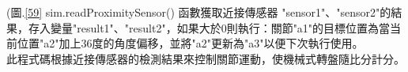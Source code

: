 (圖.\ref{59} sim.readProximitySensor() 函數獲取近接傳感器 "sensor1"、"sensor2"的結果，存入變量"result1"、"result2"，如果大於0則執行：關節"a1"的目標位置為當当前位置"a2"加上36度的角度偏移，並將"a2"更新為"a3"以便下次執行使用。\\
  此程式碼根據近接傳感器的檢測結果來控制關節運動，使機械式轉盤隨比分計分。\\